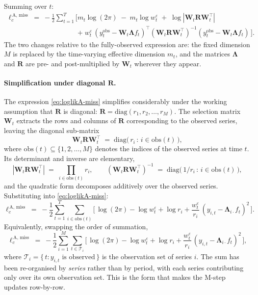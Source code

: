 \documentclass[11pt, a4paper, oneside]{article}
\newcommand{\mL}{\boldsymbol{\Lambda}}
\newcommand{\mR}{\mathbf{R}}
\begin{document}
Summing over $t$:
\begin{equation}
\begin{aligned}
\ell_c^{\,\text{A, miss}} \;=\; -\frac{1}{2}\sum_{t=1}^{T}\Bigg[\,
& m_t\log(2\pi) \;-\; m_t\log w^\varepsilon_t \;+\; \log|\mathbf{W}_t\mR\mathbf{W}_t^{\top}| \\[4pt]
& +\; w^\varepsilon_t\,(y_t^{\mathrm{obs}} - \mathbf{W}_t\mL f_t)^{\top}(\mathbf{W}_t\mR\mathbf{W}_t^{\top})^{-1}(y_t^{\mathrm{obs}} - \mathbf{W}_t\mL f_t)\,\Bigg].
\end{aligned}
\label{eq:loglikA-miss}
\end{equation}
The two changes relative to the fully-observed expression are: the
fixed dimension $M$ is replaced by the time-varying effective dimension
$m_t$, and the matrices $\mL$ and $\mR$ are pre- and post-multiplied
by $\mathbf{W}_t$ wherever they appear.

\paragraph{Simplification under diagonal $\mR$.}
The expression \eqref{eq:loglikA-miss} simplifies considerably under
the working assumption that $\mR$ is diagonal:
$\mR = \mathrm{diag}(r_1, r_2, \ldots, r_M)$. The selection matrix
$\mathbf{W}_t$ extracts the rows and columns of $\mR$ corresponding to
the observed series, leaving the diagonal sub-matrix
\[
\mathbf{W}_t\mR\mathbf{W}_t^{\top} \;=\; \mathrm{diag}\!\big(\,r_i \,:\, i \in \mathrm{obs}(t)\,\big),
\]
where $\mathrm{obs}(t) \subseteq \{1, 2, \ldots, M\}$ denotes the
indices of the observed series at time $t$. Its determinant and
inverse are elementary,
\[
|\mathbf{W}_t\mR\mathbf{W}_t^{\top}| \;=\; \prod_{i \in \mathrm{obs}(t)}\! r_i,
\qquad
(\mathbf{W}_t\mR\mathbf{W}_t^{\top})^{-1} \;=\; \mathrm{diag}\!\big(\,1/r_i \,:\, i \in \mathrm{obs}(t)\,\big),
\]
and the quadratic form decomposes additively over the observed series.
Substituting into \eqref{eq:loglikA-miss}:
\begin{equation}
\ell_c^{\,\text{A, miss}} \;=\; -\frac{1}{2}\sum_{t=1}^{T}\sum_{i\in\mathrm{obs}(t)}\!\Big[\,\log(2\pi) - \log w^\varepsilon_t + \log r_i + \frac{w^\varepsilon_t}{r_i}\,(y_{i,t} - \mL_{i\cdot} f_t)^2\,\Big].
\label{eq:loglikA-miss-diag}
\end{equation}
Equivalently, swapping the order of summation,
\begin{equation}
\ell_c^{\,\text{A, miss}} \;=\; -\frac{1}{2}\sum_{i=1}^{M}\sum_{t\in\mathcal{T}_i}\!\Big[\,\log(2\pi) - \log w^\varepsilon_t + \log r_i + \frac{w^\varepsilon_t}{r_i}\,(y_{i,t} - \mL_{i\cdot} f_t)^2\,\Big],
\label{eq:loglikA-miss-rowwise}
\end{equation}
where $\mathcal{T}_i = \{\,t : y_{i,t}\text{ is observed}\,\}$ is the
observation set of series $i$. The sum has been re-organised by
\emph{series} rather than by period, with each series contributing
only over its own observation set. This is the form that makes the
M-step updates row-by-row.
\end{document}
